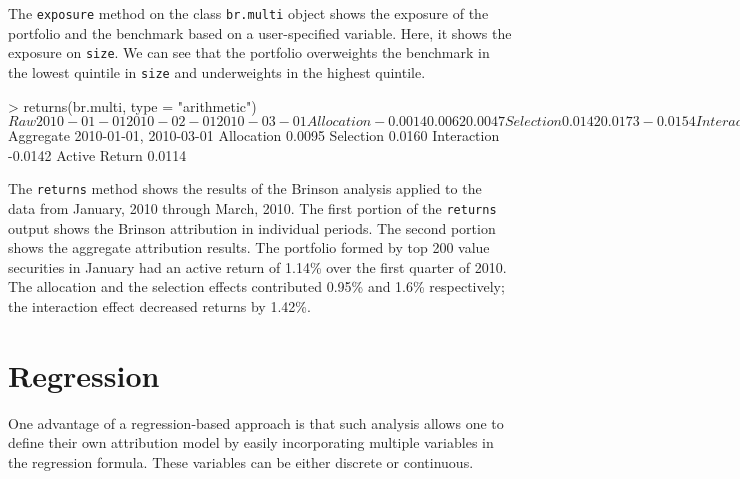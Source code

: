 The \texttt{exposure} method on the class \texttt{br.multi} object
shows the exposure of the portfolio and the benchmark based on a
user-specified variable. Here, it shows the exposure on
\texttt{size}. We can see that the portfolio overweights the benchmark
in the lowest quintile in \texttt{size} and underweights in the
highest quintile.
\begin{smallverbatim}
> returns(br.multi, type = "arithmetic")
$Raw
             2010-01-01 2010-02-01 2010-03-01
Allocation      -0.0014     0.0062     0.0047
Selection        0.0142     0.0173    -0.0154
Interaction      0.0019    -0.0072    -0.0089
Active Return    0.0147     0.0163    -0.0196

$Aggregate
             2010-01-01, 2010-03-01
Allocation                   0.0095
Selection                    0.0160
Interaction                 -0.0142
Active Return                0.0114
\end{smallverbatim}

The \texttt{returns} method shows the results of the Brinson analysis
applied to the data from January, 2010 through March, 2010. The first 
portion of the \texttt{returns} output shows
the Brinson attribution in individual periods. The second portion
shows the aggregate attribution results. The portfolio formed by top
200 value securities in January had an active return of 1.14\% over
the first quarter of 2010. The allocation and the selection effects
contributed 0.95\% and 1.6\% respectively; the interaction effect
decreased returns by 1.42\%.
\section{Regression}

One advantage of a regression-based approach is that such analysis
allows one to define their own attribution model by easily
incorporating multiple variables in the regression formula. These
variables can be either discrete or continuous.


